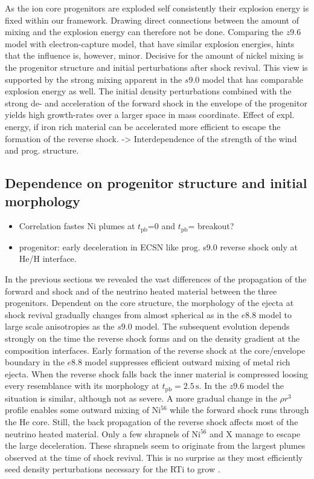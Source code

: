 \documentclass[fleqn,usenatbib]{mnras}
\newcommand{\tpb}{\ensuremath{t_{\text{pb}}}}
\newcommand{\nickel}{$\mathrm{Ni^{56}}$\xspace}
\newcommand{\tracer}{$\mathrm{X}$\xspace}
\renewcommand{\sec}{\xspace\ensuremath{\text{s}}}
\newcommand{\COM}[1]{{\color{orange}#1}}
\begin{document}
As the ion core progenitors are exploded self consistently their explosion energy is fixed within our framework. Drawing direct connections between the amount of mixing and the explosion energy can therefore not be done. Comparing the $z9.6$ model with electron-capture model, that have similar explosion energies, hints that the influence is, however, minor. Decisive for the amount of nickel mixing is the progenitor structure and initial perturbations after shock revival. This view is supported by the strong mixing apparent in the $s9.0$ model that has comparable explosion energy as well. The initial density perturbations combined with the strong de- and acceleration of the forward shock in the envelope of the progenitor yields high growth-rates over a larger space in mass coordinate. 
\COM{Effect of expl. energy, if iron rich material can be accelerated more efficient to escape the formation of the reverse shock. -> Interdependence of the strength of the wind and prog. structure. }

\subsection{Dependence on progenitor structure and initial morphology}
\COM{
\begin{itemize}
    \item Correlation fastes Ni plumes at \tpb=0 and \tpb= breakout?
    \item progenitor: early deceleration in ECSN like prog. s9.0 reverse shock only at He/H interface. 
\end{itemize}
}
In the previous sections we revealed the vast differences of the propagation of the forward and shock and of the neutrino heated material between the three progenitors. 
Dependent on the core structure, the morphology of the ejecta at shock revival gradually changes from  almost spherical as in the $e8.8$ model to large scale anisotropies as the $s9.0$ model.
The subsequent evolution depends strongly on the time the reverse shock forms and on the density gradient at the composition interfaces.
Early formation of the reverse shock at the core/envelope boundary in the $e8.8$ model suppresses efficient outward mixing of metal rich ejecta. When the reverse shock falls back the inner material is compressed loosing every resemblance with its morphology at $\tpb=2.5\,\sec$.
In the $z9.6$ model the situation is similar, although not as severe. A more gradual change in the $\rho r^3$ profile enables some outward mixing of \nickel while the forward shock runs through the He core. Still, the back propagation of the reverse shock affects most of the neutrino heated material. Only a few shrapnels of \nickel and \tracer manage to escape the large deceleration. These shrapnels seem to originate from the largest plumes observed at the time of shock revival. This is no surprise as they most efficiently seed density perturbations necessary for the RTi to grow \citep{Wongwathanarat2015}.
\end{document}

